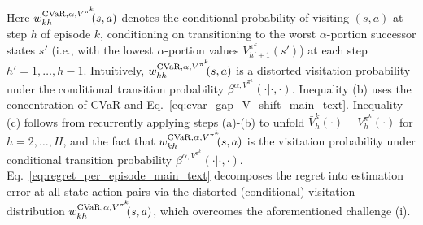 \documentclass{article} %
\newcommand{\cvar}{\textup{CVaR}}
\begin{document}
	Here $w^{\cvar,\alpha,V^{\pi^k}}_{kh}\!\!(s,a)$ denotes the conditional probability of visiting $(s,a)$ at step $h$ of episode $k$, conditioning on transitioning to the worst $\alpha$-portion successor states $s'$ (i.e., with the lowest $\alpha$-portion values $V^{\pi^k}_{h'+1}(s')$) at each step $h'=1,\dots,h-1$. Intuitively, $w^{\cvar,\alpha,V^{\pi^k}}_{kh}\!\!(s,a)$ is a distorted visitation probability under the conditional transition probability $\beta^{\alpha,V^{\pi^k}}(\cdot|\cdot,\cdot)$. Inequality (b) uses the concentration of CVaR and  Eq.~\eqref{eq:cvar_gap_V_shift_main_text}. Inequality (c) follows from recurrently applying steps (a)-(b) to unfold $\bar{V}^k_{h}(\cdot) - V^{\pi^k}_{h}(\cdot)$ for $h=2,\dots,H$, and the fact that $w^{\cvar,\alpha,V^{\pi^k}}_{kh}\!\!(s,a)$ is the visitation probability under conditional transition probability $\beta^{\alpha,V^{\pi^k}}(\cdot|\cdot,\cdot)$. 
	Eq.~\eqref{eq:regret_per_episode_main_text} decomposes the regret into estimation error at all state-action pairs via the distorted (conditional) visitation distribution $w^{\cvar,\alpha,V^{\pi^k}}_{kh}\!\!(s,a)$, which overcomes the aforementioned challenge (i).
	
\end{document}
